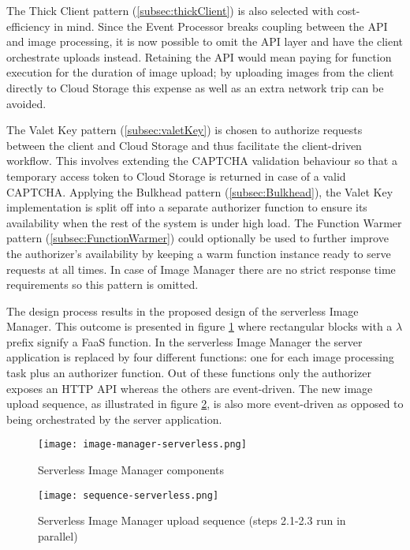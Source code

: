 The Thick Client pattern (\ref{subsec:thickClient}) is also selected with cost-efficiency in mind. Since the Event Processor breaks coupling between the API and image processing, it is now possible to omit the API layer and have the client orchestrate uploads instead. Retaining the API would mean paying for function execution for the duration of image upload; by uploading images from the client directly to Cloud Storage this expense as well as an extra network trip can be avoided.

The Valet Key pattern (\ref{subsec:valetKey}) is chosen to authorize requests between the client and Cloud Storage and thus facilitate the client-driven workflow. This involves extending the CAPTCHA validation behaviour so that a temporary access token to Cloud Storage is returned in case of a valid CAPTCHA. Applying the Bulkhead pattern (\ref{subsec:Bulkhead}), the Valet Key implementation is split off into a separate authorizer function to ensure its availability when the rest of the system is under high load. The Function Warmer pattern (\ref{subsec:FunctionWarmer}) could optionally be used to further improve the authorizer's availability by keeping a warm function instance ready to serve requests at all times. In case of Image Manager there are no strict response time requirements so this pattern is omitted.

The design process results in the proposed design of the serverless Image Manager. This outcome is presented in figure \ref{fig:serverlessArchitecture} where rectangular blocks with a $\lambda$ prefix signify a FaaS function. In the serverless Image Manager the server application is replaced by four different functions: one for each image processing task plus an authorizer function. Out of these functions only the authorizer exposes an HTTP API whereas the others are event-driven. The new image upload sequence, as illustrated in figure \ref{fig:serverlessSequence}, is also more event-driven as opposed to being orchestrated by the server application.

\begin{figure}[H]
  \centering
  \texttt{[image: image-manager-serverless.png]}
  \caption{Serverless Image Manager components}
  \label{fig:serverlessArchitecture}
\end{figure}

\begin{figure}[H]
  \centering
  \texttt{[image: sequence-serverless.png]}
  \caption{Serverless Image Manager upload sequence (steps 2.1-2.3 run in parallel)}
  \label{fig:serverlessSequence}
\end{figure}

